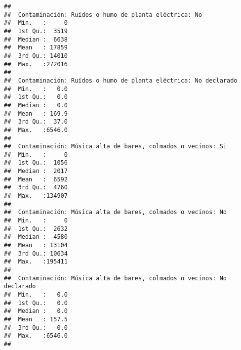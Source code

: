 \documentclass[11pt,]{article}
\begin{document}
\begin{verbatim}
##                                                      
##  Contaminación: Ruídos o humo de planta eléctrica: No
##  Min.   :     0                                      
##  1st Qu.:  3519                                      
##  Median :  6638                                      
##  Mean   : 17859                                      
##  3rd Qu.: 14010                                      
##  Max.   :272016                                      
##                                                      
##  Contaminación: Ruídos o humo de planta eléctrica: No declarado
##  Min.   :   0.0                                                
##  1st Qu.:   0.0                                                
##  Median :   0.0                                                
##  Mean   : 169.9                                                
##  3rd Qu.:  37.0                                                
##  Max.   :6546.0                                                
##                                                                
##  Contaminación: Música alta de bares, colmados o vecinos: Si
##  Min.   :     0                                             
##  1st Qu.:  1056                                             
##  Median :  2017                                             
##  Mean   :  6592                                             
##  3rd Qu.:  4760                                             
##  Max.   :134907                                             
##                                                             
##  Contaminación: Música alta de bares, colmados o vecinos: No
##  Min.   :     0                                             
##  1st Qu.:  2632                                             
##  Median :  4580                                             
##  Mean   : 13104                                             
##  3rd Qu.: 10634                                             
##  Max.   :195411                                             
##                                                             
##  Contaminación: Música alta de bares, colmados o vecinos: No declarado
##  Min.   :   0.0                                                       
##  1st Qu.:   0.0                                                       
##  Median :   0.0                                                       
##  Mean   : 157.5                                                       
##  3rd Qu.:   0.0                                                       
##  Max.   :6546.0                                                       
##                                                                       

\end{verbatim}
\end{document}
